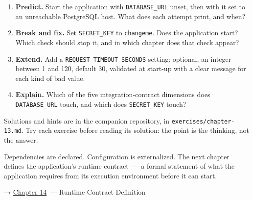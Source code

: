 \begin{enumerate}
\def\labelenumi{\arabic{enumi}.}
\tightlist
\item
  \textbf{Predict.} Start the application with \texttt{DATABASE\_URL} unset, then with it set to an unreachable PostgreSQL host. What does each attempt print, and when?
\item
  \textbf{Break and fix.} Set \texttt{SECRET\_KEY} to \texttt{changeme}. Does the application start? Which check should stop it, and in which chapter does that check appear?
\item
  \textbf{Extend.} Add a \texttt{REQUEST\_TIMEOUT\_SECONDS} setting: optional, an integer between 1 and 120, default 30, validated at start-up with a clear message for each kind of bad value.
\item
  \textbf{Explain.} Which of the five integration-contract dimensions does \texttt{DATABASE\_URL} touch, and which does \texttt{SECRET\_KEY} touch?
\end{enumerate}

\noindent{}Solutions and hints are in the companion repository, in \texttt{exercises/}\allowbreak{}\texttt{chapter-13.md}. Try each exercise before reading its solution: the point is the thinking, not the answer.

\label{13-configuration-externalization:whats-next}

Dependencies are declared. Configuration is externalized. The next chapter defines the application's runtime contract~--- a formal statement of what the application requires from its execution environment before it can start.

\noindent{}→ \hyperref[ch:14-runtime-contract]{Chapter 14}~--- Runtime Contract Definition
